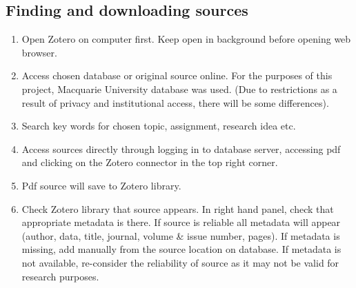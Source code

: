 \documentclass{article}
\begin{document}
\subsection{Finding and downloading sources}
\begin{enumerate}
\item Open Zotero on computer first. Keep open in background before opening web browser.
    \item Access chosen database or original source online. For the purposes of this project, Macquarie University database was used. (Due to restrictions as a result of privacy and institutional access, there will be some differences).
    \item Search key words for chosen topic, assignment, research idea etc.
    \item Access sources directly through logging in to database server, accessing pdf and clicking on the Zotero connector in the top right corner.
    \item Pdf source will save to Zotero library.
    \item Check Zotero library that source appears. In right hand panel, check that appropriate metadata is there. If source is reliable all metadata will appear (author, data, title, journal, volume & issue number, pages). If metadata is missing, add manually from the source location on database. If metadata is not available, re-consider the reliability of source as it may not be valid for research purposes.
\end{enumerate}
\end{document}
